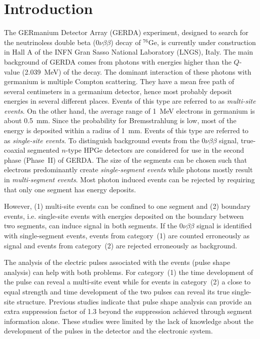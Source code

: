\documentclass[epj,referee]{svjour}
\begin{document}
\section{Introduction}
\label{s:intro}
The GERmanium Detector Array (GERDA) experiment, designed to search
for the neutrinoless double beta ($0\nu\beta\beta$) decay of
$^{76}$Ge, is currently under construction in Hall A of the INFN Gran
Sasso National Laboratory (LNGS), Italy. \cite{Abt04,Sch05} The main
background of GERDA comes from photons with energies higher than the
$Q$-value (2.039~MeV) of the decay. The dominant interaction of these
photons with germanium is multiple Compton scattering. They have a
mean free path of several centimeters in a germanium detector, hence
most probably deposit energies in several different places. Events of
this type are referred to as \emph{multi-site events}. On the other
hand, the average range of 1~MeV electrons in germanium is about
0.5~mm. Since the probability for Bremsstrahlung is low, most of the
energy is deposited within a radius of 1~mm. Events of this type are
referred to as \emph{single-site events}. To distinguish background
events from the $0\nu\beta\beta$ signal, true-coaxial segmented
$n$-type HPGe detectors are considered for use in the second phase
(Phase~II) of GERDA. The size of the segments can be chosen such that
electrons predominantly create \emph{single-segment events} while
photons mostly result in \emph{multi-segment events}. Most photon
induced events can be rejected by requiring that only one segment has
energy deposits. \cite{photon}

However, (1) multi-site events can be confined to one segment and (2)
boundary events, i.e. single-site events with energies deposited on
the boundary between two segments, can induce signal in both
segments. If the $0\nu\beta\beta$ signal is identified with
single-segment events, events from category~(1) are counted
erroneously as signal and events from category~(2) are rejected
erroneously as background.

The analysis of the electric pulses associated with the events (pulse
shape analysis) can help with both problems. For category~(1) the time
development of the pulse can reveal a multi-site event while for
events in category~(2) a close to equal strength and time development
of the two pulses can reveal its true single-site structure. Previous
studies \cite{psa} indicate that pulse shape analysis can provide an
extra suppression factor of 1.3 beyond the suppression achieved
through segment information alone. These studies were limited by the
lack of knowledge about the development of the pulses in the detector
and the electronic system.
\end{document}
